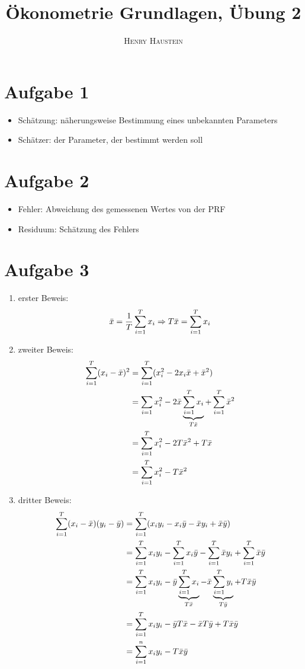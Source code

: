 \documentclass{article}
\title{\textbf{Ökonometrie Grundlagen, Übung 2}}
\author{\textsc{Henry Haustein}}
\date{}
\begin{document}
	\maketitle
	
	\section*{Aufgabe 1}
	\begin{itemize}
		\item Schätzung: näherungsweise Bestimmung eines unbekannten Parameters
		\item Schätzer: der Parameter, der bestimmt werden soll
	\end{itemize}
	
	\section*{Aufgabe 2}
	\begin{itemize}
		\item Fehler: Abweichung des gemessenen Wertes von der PRF
		\item Residuum: Schätzung des Fehlers
	\end{itemize}

	\section*{Aufgabe 3}
	\begin{enumerate}[label=(\alph*)]
		\item erster Beweis:
		\begin{align}
			\bar{x} = \frac{1}{T}\sum_{i=1}^{T} x_i  \Rightarrow T\bar{x} = \sum_{i=1}^T x_i \notag
		\end{align}
		\item zweiter Beweis:
		\begin{align}
			\sum_{i=1}^T (x_i-\bar{x})^2 &= \sum_{i=1}^T(x_i^2 - 2x_i\bar{x} + \bar{x}^2) \notag \\
			&= \sum_{i=1} x_i^2 - 2\bar{x}\underbrace{\sum_{i=1}^T x_i}_{T\bar{x}} + \sum_{i=1}^T \bar{x}^2  \notag \\
			&= \sum_{i=1}^T x_i^2 - 2T\bar{x}^2 + T\bar{x} \notag \\
			&= \sum_{i=1}^T x_i^2 - T\bar{x}^2 \notag
		\end{align}
		\item dritter Beweis:
		\begin{align}
			\sum_{i=1}^T (x_i-\bar{x})(y_i-\bar{y}) &= \sum_{i=1}^T (x_iy_i - x_i\bar{y} - \bar{x}y_i + \bar{x}\bar{y}) \notag \\
			&= \sum_{i=1}^T x_iy_i - \sum_{i=1}^T x_i\bar{y} - \sum_{i=1}^T \bar{x}y_i + \sum_{i=1}^T \bar{x}\bar{y} \notag \\
			&= \sum_{i=1}^T x_iy_i - \bar{y}\underbrace{\sum_{i=1}^T x_i}_{T\bar{x}} - \bar{x}\underbrace{\sum_{i=1}^T y_i}_{T\bar{y}} + T\bar{x}\bar{y} \notag \\
			&= \sum_{i=1}^T x_iy_i - \bar{y}T\bar{x} - \bar{x}T\bar{y} + T\bar{x}\bar{y} \notag \\
			&= \sum_{i=1}^n x_iy_i - T\bar{x}\bar{y} \notag
		\end{align}
	\end{enumerate}
\end{document}

